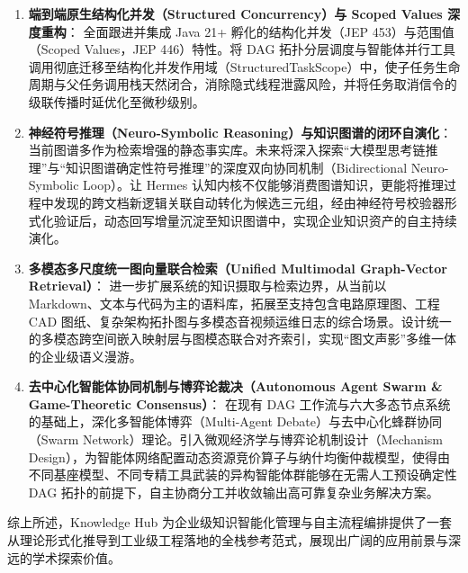 \begin{enumerate}
    \item \textbf{端到端原生结构化并发（Structured Concurrency）与 Scoped Values 深度重构}：
    全面跟进并集成 Java 21+ 孵化的结构化并发（JEP 453）与范围值（Scoped Values，JEP 446）特性。将 DAG 拓扑分层调度与智能体并行工具调用彻底迁移至结构化并发作用域（StructuredTaskScope）中，使子任务生命周期与父任务调用栈天然闭合，消除隐式线程泄露风险，并将任务取消信令的级联传播时延优化至微秒级别。

    \item \textbf{神经符号推理（Neuro-Symbolic Reasoning）与知识图谱的闭环自演化}：
    当前图谱多作为检索增强的静态事实库。未来将深入探索“大模型思考链推理”与“知识图谱确定性符号推理”的深度双向协同机制（Bidirectional Neuro-Symbolic Loop）。让 Hermes 认知内核不仅能够消费图谱知识，更能将推理过程中发现的跨文档新逻辑关联自动转化为候选三元组，经由神经符号校验器形式化验证后，动态回写增量沉淀至知识图谱中，实现企业知识资产的自主持续演化。

    \item \textbf{多模态多尺度统一图向量联合检索（Unified Multimodal Graph-Vector Retrieval）}：
    进一步扩展系统的知识摄取与检索边界，从当前以 Markdown、文本与代码为主的语料库，拓展至支持包含电路原理图、工程 CAD 图纸、复杂架构拓扑图与多模态音视频运维日志的综合场景。设计统一的多模态跨空间嵌入映射层与图模态联合对齐索引，实现“图文声影”多维一体的企业级语义漫游。

    \item \textbf{去中心化智能体协同机制与博弈论裁决（Autonomous Agent Swarm \& Game-Theoretic Consensus）}：
    在现有 DAG 工作流与六大多态节点系统的基础上，深化多智能体博弈（Multi-Agent Debate）与去中心化蜂群协同（Swarm Network）理论。引入微观经济学与博弈论机制设计（Mechanism Design），为智能体网络配置动态资源竞价算子与纳什均衡仲裁模型，使得由不同基座模型、不同专精工具武装的异构智能体群能够在无需人工预设确定性 DAG 拓扑的前提下，自主协商分工并收敛输出高可靠复杂业务解决方案。
\end{enumerate}

综上所述，Knowledge Hub 为企业级知识智能化管理与自主流程编排提供了一套从理论形式化推导到工业级工程落地的全栈参考范式，展现出广阔的应用前景与深远的学术探索价值。
